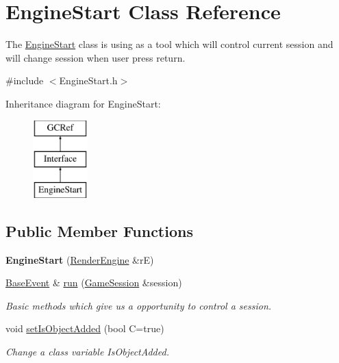 \hypertarget{classEngineStart}{}\section{Engine\+Start Class Reference}
\label{classEngineStart}


The \hyperlink{classEngineStart}{Engine\+Start} class is using as a tool which will control current session and will change session when user press return.  




{\ttfamily \#include $<$Engine\+Start.\+h$>$}

Inheritance diagram for Engine\+Start\+:\begin{figure}[H]
\begin{center}
\leavevmode
\includegraphics[height=3.000000cm]{classEngineStart}
\end{center}
\end{figure}
\subsection*{Public Member Functions}
\begin{DoxyCompactItemize}
\item 
\hypertarget{classEngineStart_aa40d0a5b9d72a3ce33a8f8fa99656b08}{}{\bfseries Engine\+Start} (\hyperlink{classRenderEngine}{Render\+Engine} \&r\+E)\label{classEngineStart_aa40d0a5b9d72a3ce33a8f8fa99656b08}

\item 
\hyperlink{classBaseEvent}{Base\+Event} \& \hyperlink{classEngineStart_a9caa9db3213371e5a77f1b09576a04fa}{run} (\hyperlink{classGameSession}{Game\+Session} \&session)
\begin{DoxyCompactList}\small\item\em Basic methods which give us a opportunity to control a session. \end{DoxyCompactList}\item 
\hypertarget{classEngineStart_aa69bfc21de9586ba2058aa07d9790b02}{}void \hyperlink{classEngineStart_aa69bfc21de9586ba2058aa07d9790b02}{set\+Is\+Object\+Added} (bool C=true)\label{classEngineStart_aa69bfc21de9586ba2058aa07d9790b02}

\begin{DoxyCompactList}\small\item\em Change a class variable Is\+Object\+Added. \end{DoxyCompactList}\end{DoxyCompactItemize}



